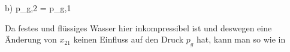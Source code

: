 b) \quad p_{g,2} = p_{g,1}

Da festes und flüssiges Wasser hier inkompressibel ist und deswegen eine Änderung von $x_{21}$ keinen Einfluss auf den Druck $p_{g}$ hat, kann man so wie in